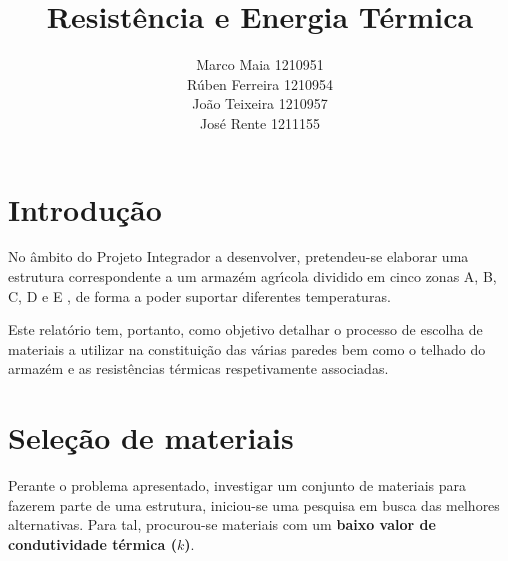 \documentclass[12pt, a4paper]{article}
\title{
    Resist\^{e}ncia e Energia {\textemdash} T\'ermica
}
\author{
    Marco Maia          {\textemdash}    1210951\\
    R\'{u}ben Ferreira  {\textemdash}    1210954\\
    Jo\~{a}o Teixeira   {\textemdash}    1210957\\
    Jos\'{e} Rente      {\textemdash}    1211155\\
}
\begin{document}
\makeatletter
{}
\makeatother
\thispagestyle{empty}
\newpage

{
    \hypersetup{hidelinks}
    \tableofcontents
    \printindex
    \newpage
}


\section{Introdu\c{c}\~ao}\label{sec:intro}

No \^ambito do Projeto Integrador a desenvolver, pretendeu-se elaborar uma estrutura
correspondente a um armaz\'em agr\'{\i}cola dividido em cinco zonas {\textemdash}
A, B, C, D e E {\textemdash}, de forma a poder suportar diferentes temperaturas.

Este relat\'orio tem, portanto, como objetivo detalhar o processo de escolha de materiais
a utilizar na constitui\c{c}\~ao das v\'arias paredes {\textemdash} bem como o telhado
{\textemdash} do armaz\'em e as resist\^encias t\'ermicas respetivamente associadas.


\section{Seleção de materiais}\label{sec:select}

Perante o problema apresentado, investigar um conjunto de materiais para fazerem parte de uma
estrutura, iniciou-se uma pesquisa em busca das melhores alternativas. Para tal, procurou-se
materiais com um \textbf{baixo valor de condutividade térmica ($k$)}.
\end{document}
